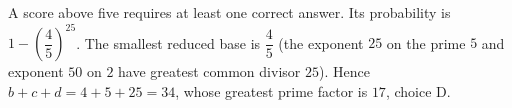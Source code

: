 A score above five requires at least one correct answer. Its probability is $1-\left(\dfrac{4}{5}\right)^{25}$. The smallest reduced base is $\dfrac{4}{5}$ (the exponent $25$ on the prime $5$ and exponent $50$ on $2$ have greatest common divisor $25$). Hence $b+c+d=4+5+25=34$, whose greatest prime factor is $\boxed{17}$, choice D.
